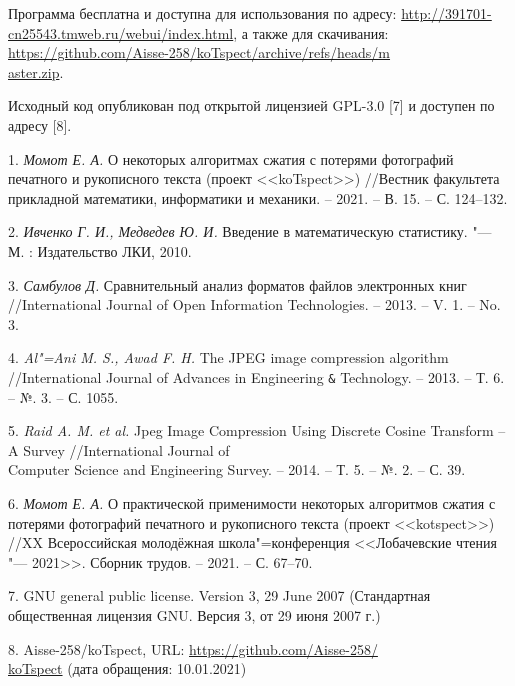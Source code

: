Программа бесплатна и доступна для использования по адресу: \href{http://391701-cn25543.tmweb.ru/webui/index.html}{http://391701-cn25543.tmweb.ru/webui/index.html},
а также для скачивания:\\\href{https://github.com/Aisse-258/koTspect/archive/refs/heads/master.zip}{https://github.com/Aisse-258/koTspect/archive/refs/heads/m\\aster.zip}.

Исходный код опубликован под открытой лицензией {GPL-3.0} [7] и доступен по адресу [8].





\litlist

1. {\it Момот Е. А.} О некоторых алгоритмах сжатия с потерями фотографий печатного и рукописного текста (проект <<{koTspect}>>) //Вестник факультета прикладной математики, информатики и механики. -- 2021. -- В. 15. -- С. 124--132.

2. {\it Ивченко Г. И., Медведев Ю. И.} Введение в математическую статистику. "--- М. : Издательство ЛКИ, 2010.

3. {\it Самбулов Д.} Сравнительный анализ форматов файлов электронных книг //\foreignlanguage{english}{International Journal of Open Information Technologies. -- 2013. -- V. 1. -- No. 3.}

4. {\it Al"=Ani M. S., Awad F. H.} The JPEG image compression algorithm //International Journal of Advances in Engineering \verb|&| Technology. -- 2013. -- Т. 6. -- №. 3. -- С. 1055.

5. {\it Raid A. M. et al.} Jpeg Image Compression Using Discrete Cosine Transform -- A Survey //International Journal of\\Computer Science and Engineering Survey. -- 2014. -- Т. 5. -- №. 2. -- С. 39.

6. {\it Момот Е. А.} О практической применимости некоторых алгоритмов сжатия с потерями фотографий печатного и рукописного текста (проект <<{kotspect}>>) //{XX} Всероссийская молодёжная школа"=конференция <<Лобачевские чтения "--- 2021>>. Сборник трудов. -- 2021. -- С. 67--70.

7. GNU general public license. Version 3, 29 June 2007 (Стандартная общественная лицензия {GNU}. Версия 3, от 29 июня 2007 г.)

8. Aisse-258/koTspect, URL: \href{https://github.com/Aisse-258/koTspect}{https://github.com/Aisse-258/\\koTspect} (дата обращения: 10.01.2021)
